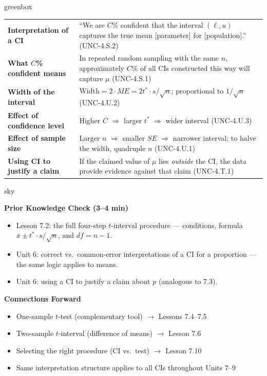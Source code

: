 \documentclass[10pt]{article}
\begin{document}
\begin{skillbox}{greenbox}
\renewcommand{\arraystretch}{1.3}
\begin{tabularx}{\linewidth}{lX}
    \textbf{Interpretation of a CI} &
        ``We are $C$\% confident that the interval $(\ell, u)$ captures the true mean
        [parameter] for [population].'' (UNC-4.S.2) \\
    \textbf{What $C$\% confident means} &
        In repeated random sampling with the same $n$, approximately $C$\% of all
        CIs constructed this way will capture $\mu$ (UNC-4.S.1) \\
    \textbf{Width of the interval} &
        $\text{Width} = 2 \cdot ME = 2t^* \cdot s/\sqrt{n}$; proportional to
        $1/\sqrt{n}$ (UNC-4.U.2) \\
    \textbf{Effect of confidence level} &
        Higher $C$ $\Rightarrow$ larger $t^*$ $\Rightarrow$ wider interval
        (UNC-4.U.3) \\
    \textbf{Effect of sample size} &
        Larger $n$ $\Rightarrow$ smaller $SE$ $\Rightarrow$ narrower interval;
        to halve the width, quadruple $n$ (UNC-4.U.1) \\
    \textbf{Using CI to justify a claim} &
        If the claimed value of $\mu$ lies \emph{outside} the CI, the data provide
        evidence against that claim (UNC-4.T.1) \\
\end{tabularx}
\end{skillbox}

\begin{skillbox}{sky}
\begin{minipage}[t]{0.48\linewidth}
    \textbf{Prior Knowledge Check (3--4 min)}
    \begin{itemize}
        \item Lesson 7.2: the full four-step $t$-interval procedure --- conditions,
              formula $\bar x \pm t^* \cdot s/\sqrt{n}$, and $df = n - 1$.
        \item Unit 6: correct vs.\ common-error interpretations of a CI for
              a proportion --- the same logic applies to means.
        \item Unit 6: using a CI to justify a claim about $p$ (analogous to 7.3).
    \end{itemize}
\end{minipage}
\hfill
\begin{minipage}[t]{0.48\linewidth}
    \textbf{Connections Forward}
    \begin{itemize}
        \item One-sample $t$-test (complementary tool) $\to$ Lessons 7.4--7.5
        \item Two-sample $t$-interval (difference of means) $\to$ Lesson 7.6
        \item Selecting the right procedure (CI vs.\ test) $\to$ Lesson 7.10
        \item Same interpretation structure applies to all CIs throughout Units 7--9
    \end{itemize}
\end{minipage}
\end{skillbox}
\end{document}
